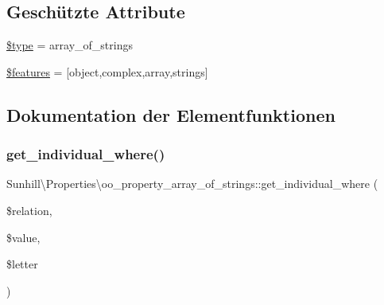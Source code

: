 \subsection*{Geschützte Attribute}
\begin{DoxyCompactItemize}
\item 
\hyperlink{classSunhill_1_1Properties_1_1oo__property__array__of__strings_a00165ba3affdfc97e9451cc31af8a6cf}{\$type} = \textquotesingle{}array\+\_\+of\+\_\+strings\textquotesingle{}
\item 
\hyperlink{classSunhill_1_1Properties_1_1oo__property__array__of__strings_a4857b01e3d2f7ec06a6f7eb68f9ebfa0}{\$features} = \mbox{[}\textquotesingle{}object\textquotesingle{},\textquotesingle{}complex\textquotesingle{},\textquotesingle{}array\textquotesingle{},\textquotesingle{}strings\textquotesingle{}\mbox{]}
\end{DoxyCompactItemize}


\subsection{Dokumentation der Elementfunktionen}
\mbox{\label{classSunhill_1_1Properties_1_1oo__property__array__of__strings_a4b6c62b2657664cea52331d41d93441b}} 
\subsubsection{\texorpdfstring{get\+\_\+individual\+\_\+where()}{get\_individual\_where()}}
{\footnotesize\ttfamily Sunhill\textbackslash{}\+Properties\textbackslash{}oo\+\_\+property\+\_\+array\+\_\+of\+\_\+strings\+::get\+\_\+individual\+\_\+where (\begin{DoxyParamCaption}\item[{}]{\$relation,  }\item[{}]{\$value,  }\item[{}]{\$letter }\end{DoxyParamCaption})\hspace{0.3cm}{\ttfamily [protected]}}

